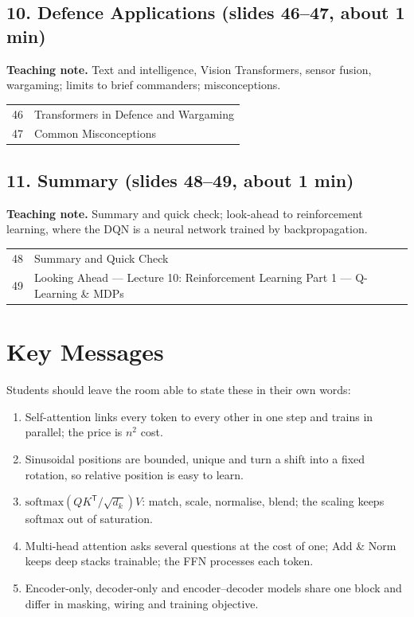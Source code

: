 \documentclass[11pt]{article}
\begin{document}
\subsection{10. Defence Applications \normalfont\small\color{GreyN}(slides 46--47, about 1 min)}

\textbf{Teaching note.} Text and intelligence, Vision Transformers, sensor fusion, wargaming; limits to brief commanders; misconceptions.

\begin{center}\small\renewcommand{\arraystretch}{1.1}\begin{tabularx}{\textwidth}{@{}r X@{}}46 & Transformers in Defence and Wargaming\\
47 & Common Misconceptions\\\end{tabularx}\end{center}

\subsection{11. Summary \normalfont\small\color{GreyN}(slides 48--49, about 1 min)}

\textbf{Teaching note.} Summary and quick check; look-ahead to reinforcement learning, where the DQN is a neural network trained by backpropagation.

\begin{center}\small\renewcommand{\arraystretch}{1.1}\begin{tabularx}{\textwidth}{@{}r X@{}}48 & Summary and Quick Check\\
49 & Looking Ahead --- Lecture 10: Reinforcement Learning Part 1 --- Q-Learning \& MDPs\\\end{tabularx}\end{center}

\section{Key Messages}Students should leave the room able to state these in their own words:\begin{keypoint}\begin{enumerate}\item Self-attention links every token to every other in one step and trains in parallel; the price is $n^2$ cost.\item Sinusoidal positions are bounded, unique and turn a shift into a fixed rotation, so relative position is easy to learn.\item $\text{softmax}(QK^{\mathsf T}/\sqrt{d_k})V$: match, scale, normalise, blend; the scaling keeps softmax out of saturation.\item Multi-head attention asks several questions at the cost of one; Add \& Norm keeps deep stacks trainable; the FFN processes each token.\item Encoder-only, decoder-only and encoder--decoder models share one block and differ in masking, wiring and training objective.\end{enumerate}\end{keypoint}
\end{document}
